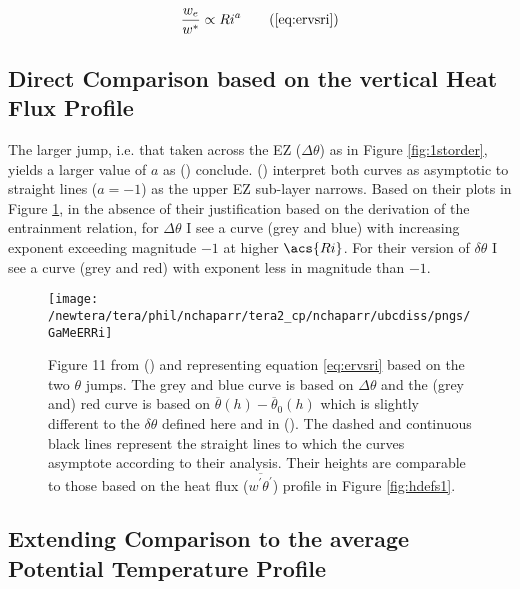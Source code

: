 \begin{equation}
\frac{w_{e}}{w^{*}} \propto Ri^{a} \tag{\ref{eq:ervsri}}
\end{equation}

\subsection{Direct Comparison based on the vertical Heat Flux Profile}
The larger jump, i.e. that taken across the \acs{EZ} ($\Delta \theta$) as in Figure \ref{fig:1storder}, yields a larger value of $a$ as \citeauthor{FedConzMir04} (\citeyear{FedConzMir04}) conclude.  \citeauthor{GarciaMellado} (\citeyear{GarciaMellado}) interpret both curves as asymptotic to straight lines ($a=-1$) as the upper \acs{EZ} sub-layer narrows. Based on their plots in Figure \ref{fig:GarcMelERRi}, in the absence of their justification based on the derivation of the entrainment relation, for $\Delta \theta$ I see a curve (grey and blue) with increasing exponent exceeding magnitude $-1$ at higher $\acs{Ri}$.  For their version of $\delta \theta$ I see a curve (grey and red) with exponent less in magnitude than $-1$.\\

\begin{figure}[htbp]
    \centering
    \texttt{[image: /newtera/tera/phil/nchaparr/tera2\_cp/nchaparr/ubcdiss/pngs/GaMeERRi]}
    \caption[Plots of scaled Entrainment Rate vs Richardson Number from \citeauthor{GarciaMellado} (\citeyear{GarciaMellado})]{Figure 11 from \citeauthor{GarciaMellado} (\citeyear{GarciaMellado}) and representing equation \ref{eq:ervsri} based on the two $\theta$ jumps.  The grey and blue curve is based on $\Delta \theta$ and the (grey and) red curve is based on $\overline{\theta}(h) - \overline{\theta}_{0}(h)$ which is slightly different to the $\delta \theta$ defined here and in \citeauthor{FedConzMir04} (\citeyear{FedConzMir04}). The dashed and continuous black lines represent the straight lines to which the curves asymptote according to their analysis. Their heights are comparable to those based on the heat flux ($\overline{w^{'}\theta^{'}}$) profile in Figure \ref{fig:hdefs1}.}
    \label{fig:GarcMelERRi}   %
\end{figure}

\subsection{Extending Comparison to the average Potential Temperature Profile}

